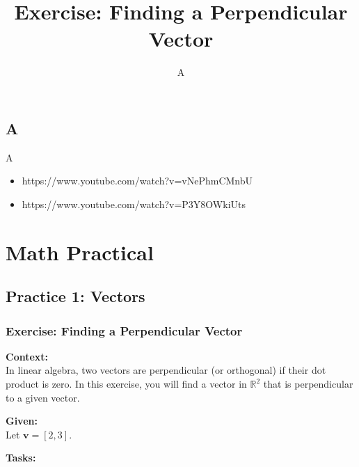 \documentclass[
  letterpaper,
  DIV=11,
  numbers=noendperiod]{scrreprt}
\title{Exercise: Finding a Perpendicular Vector}
\author{A}
\date{}
\renewcommand*\contentsname{Table of contents}
\newcommand\contentsname{Table of contents}
\begin{document}
\maketitle

\renewcommand*\contentsname{Table of contents}
{
\hypersetup{linkcolor=}
\setcounter{tocdepth}{2}
\tableofcontents
}


\chapter{A}\label{a}

A

\begin{itemize}
\item
  https://www.youtube.com/watch?v=vNePhmCMnbU
\item
  https://www.youtube.com/watch?v=P3Y8OWkiUts
\end{itemize}

\part{Math \textbar{} Practical}

\chapter{Practice 1: Vectors}\label{practice-1-vectors}

\section{Exercise: Finding a Perpendicular
Vector}\label{exercise-finding-a-perpendicular-vector}

\textbf{Context:}\\
In linear algebra, two vectors are perpendicular (or orthogonal) if
their dot product is zero. In this exercise, you will find a vector in
\(\mathbb{R}^2\) that is perpendicular to a given vector.

\textbf{Given:}\\
Let \(\mathbf{v} = [2, 3]\).

\textbf{Tasks:}
\end{document}
